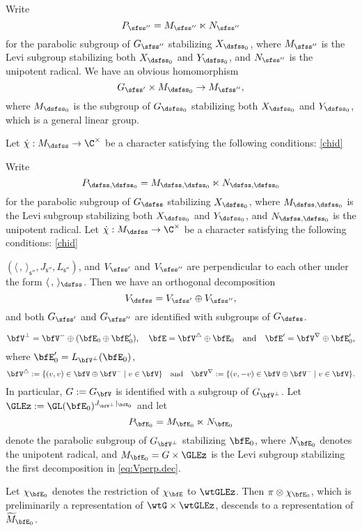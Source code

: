 \documentclass[12pt,a4paper]{amsart}
\newcommand{\wtM}{\widetilde{M}}
\newcommand{\la}{\langle}
\newcommand{\ra}{\rangle}
\numberwithin{equation}{section}
\theoremstyle{remark}
\begin{document}
 Write
\[
  P_{\sfss''}=M_{\sfss''}\ltimes N_{\sfss''}
\]
for the parabolic subgroup of $G_{\sfss''}$ stabilizing $X_{\dsfss_0}$, where $M_{\sfss''}$ is the Levi subgroup stabilizing both $X_{\dsfss_0}$ and $Y_{\dsfss_0}$, and $N_{\sfss''}$ is the unipotent radical. We have an obvious homomorphism
\[
  G_{\sfss'}\times M_{\dsfss_0}\rightarrow M_{\sfss''},
\]
where $M_{\dsfss_0}$ is the subgroup of $G_{\dsfss_0}$ stabilizing both $X_{\dsfss_0}$ and $Y_{\dsfss_0}$, which is a general linear group.

Let $\dot{\chi}: M_{\dsfss}\rightarrow \C^\times $ be a character satisfying the following conditions:
\eqref{chid}

Write
\[
  P_{\dsfss,\dsfss_0}=M_{\dsfss, \dsfss_0}\ltimes N_{\dsfss,\dsfss_0}
\]
for the parabolic subgroup of $G_\dsfss$ stabilizing $X_{\dsfss_0}$, where $M_{\dsfss, \dsfss_0}$ is the Levi subgroup stabilizing both $X_{\dsfss_0}$ and $Y_{\dsfss_0}$, and $N_{\dsfss,\dsfss_0}$ is the unipotent radical.
Let $\dot{\chi}: M_{\dsfss}\rightarrow \C^\times $ be a character satisfying the following conditions:
\eqref{chid}



 $(\la\,,\,\ra_{\mathsf s''}, J_{\mathsf s''}, L_{\mathsf s''})$, and $V_{\sfss'}$ and $V_{\sfss''}$ are perpendicular to each other under the form $\la\,,\,\ra_{\dsfss}$. Then we have an orthogonal decomposition
\[
  V_\dsfss=V_{\sfss'}\oplus V_{\sfss''},
\]
and both $G_{\sfss'}$ and $G_{\sfss''}$ are identified with subgroups of $G_{\dsfss}$.


\begin{equation}
\label{eq:Vperp.dec}
  \bfV^\perp=\bfV^-\oplus (\bfE_0\oplus \bfE_0'), \quad  \bfE=\bfV^\triangle \oplus \bfE_0\quad \textrm{and}\quad \bfE'=\bfV^\nabla\oplus \bfE_0',
\end{equation}
where $\bfE_0'=L_{\bfV^\perp} (\bfE_0)$,
\[
\bfV^\triangle:=\{(v,v)\in \bfV\oplus \bfV^-\mid v\in \bfV\}\quad\textrm{and}\quad \bfV^\nabla:=\{(v,-v)\in \bfV\oplus \bfV^-\mid v\in \bfV\}.
\]
In particular, $G:=G_{\bfV}$ is identified with a subgroup of $G_{\bfV^\perp}$.
Let $\GLEz := \GL(\bfE_0)^{J_{\bfV^\perp}|_{\bfE_0}}$ and let
\[
  P_{\bfE_0}=M_{\bfE_0}\ltimes N_{\bfE_0}
\]
denote the parabolic subgroup of $G_{\bfV^\perp}$ stabilizing $\bfE_0$, where
$N_{\bfE_0}$ denotes the unipotent radical, and $M_{\bfE_0}=G\times
\GLEz$ is the Levi subgroup stabilizing the first decomposition
in \eqref{eq:Vperp.dec}.

Let $\chi_{\bfE_0}$ denotes the restriction of $\chi_{\bfE}$ to
$\wtGLEz$. Then $\pi\otimes \chi_{\bfE_0}$,
which is preliminarily a representation of $\wtG\times
\wtGLEz$, descends to a representation of
$\wtM_{\bfE_0}$.
\end{document}
